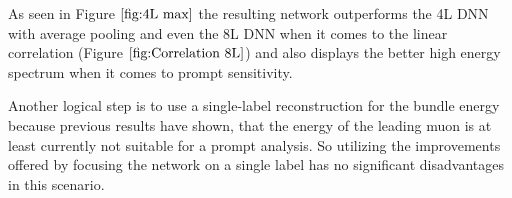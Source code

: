 \documentclass[
  tucolor,       %
  BCOR=12mm,     %
  parskip=half,  %
  open=any,      %
  cleardoublepage=plain,  %
]{tudothesis}
\begin{document}
As seen in Figure $\ref{fig:4L max}$ the resulting network outperforms the 4L DNN with average pooling and even the 8L DNN when it comes to the linear correlation (Figure $\ref{fig:Correlation 8L}$) and also displays the better high energy spectrum when it comes to prompt sensitivity.

Another logical step is to use a single-label reconstruction for the bundle energy because previous results have shown, that the energy of the leading muon is at least currently not suitable for a prompt analysis. So utilizing the improvements offered by focusing the network on a single label has no significant disadvantages in this scenario. 

\end{document}
